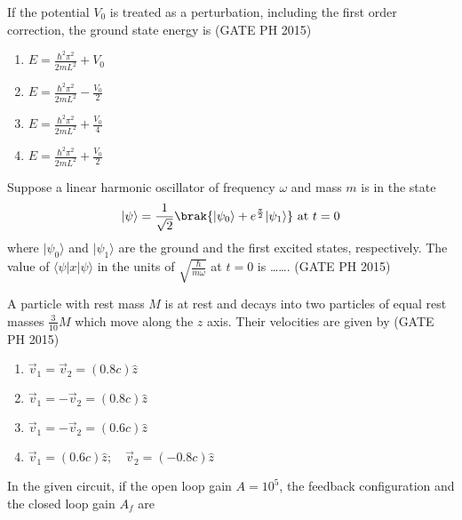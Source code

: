 If the potential \( V_0 \) is treated as a perturbation, including the first order correction, the ground state energy is \hfill (GATE PH 2015)

\begin{multicols}{4}
    \begin{enumerate}
        \item \( E = \frac{\hbar^2 \pi^2}{2mL^2} + V_0 \)
        \item \( E = \frac{\hbar^2 \pi^2}{2mL^2} - \frac{V_0}{2} \)
        \item \( E = \frac{\hbar^2 \pi^2}{2mL^2} + \frac{V_0}{4} \)
        \item \( E = \frac{\hbar^2 \pi^2}{2mL^2} + \frac{V_0}{2} \)
    \end{enumerate}
\end{multicols}

\item

Suppose a linear harmonic oscillator of frequency \( \omega \) and mass \( m \) is in the state
\[
\vert{\psi}\rangle = \frac{1}{\sqrt{2}} \brak{ \vert{\psi_0}\rangle + e^{\frac{\pi}{2}} \vert{\psi_1}\rangle } \text{ at } t = 0
\]
where \( \vert{\psi_0}\rangle \) and \( \vert{\psi_1}\rangle \) are the ground and the first excited states, respectively. The value of \( \langle{\psi | x | \psi}\rangle \) in the units of \( \sqrt{\frac{\hbar}{m \omega}} \) at \( t = 0 \) is \ldots\ldots. \hfill (GATE PH 2015)

\item A particle with rest mass \( M \) is at rest and decays into two particles of equal rest masses \( \frac{3}{10} M \) which move along the \( z \) axis. Their velocities are given by \hfill (GATE PH 2015)

\begin{multicols}{2}
    \begin{enumerate}
        \item \( \vec{v}_1 = \vec{v}_2 = (0.8c) \hat{z} \)
        \item \( \vec{v}_1 = -\vec{v}_2 = (0.8c) \hat{z} \)
        \item \( \vec{v}_1 = -\vec{v}_2 = (0.6c) \hat{z} \)
        \item \( \vec{v}_1 = (0.6c) \hat{z}; \quad \vec{v}_2 = (-0.8c) \hat{z} \)
    \end{enumerate}
\end{multicols}

\item In the given circuit, if the open loop gain \( A = 10^5 \), the feedback configuration and the closed loop gain \( A_f \) are

